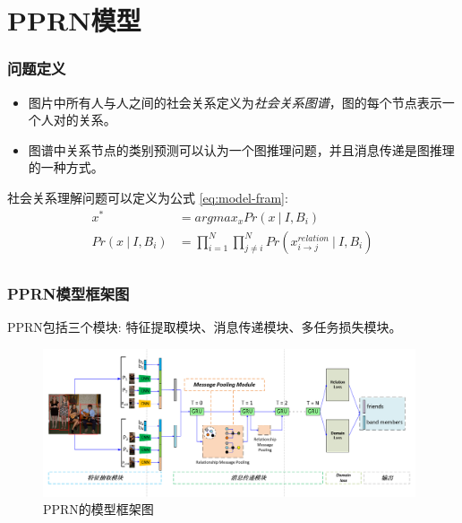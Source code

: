 \documentclass[UTF8]{beamer}
\begin{document}
\section{PPRN模型}
\begin{frame}
    \frametitle{问题定义}
    \begin{block}{}
        \begin{itemize}
            \item 图片中所有人与人之间的社会关系定义为{\it 社会关系图谱}，图的每个节点表示一个人对的关系。
            \item 图谱中关系节点的类别预测可以认为一个图推理问题，并且消息传递是图推理的一种方式。
        \end{itemize}
    \end{block}
    社会关系理解问题可以定义为公式 \ref{eq:model-fram}:
    \begin{equation} \label{eq:model-fram}
        \begin{split}
            x^{*} &= argmax_{x}Pr(x~|~I,B_{i}) \\
            Pr(x~|~I,B_{i}) &= \prod_{i=1}^{N}\prod_{j \neq i}^{N}Pr(x_{i \rightarrow j}^{relation}~|~I,B_{i}) \\
        \end{split}
    \end{equation}
\end{frame}

\begin{frame}
    \frametitle{PPRN模型框架图}
    PPRN包括三个模块: 特征提取模块、消息传递模块、多任务损失模块。
    \begin{figure}
        \centering
        \includegraphics[width=0.98\textwidth]{images/model.png}
        \caption{PPRN的模型框架图}
        \label{fig:PPRN}
    \end{figure}
\end{frame}
\end{document}
